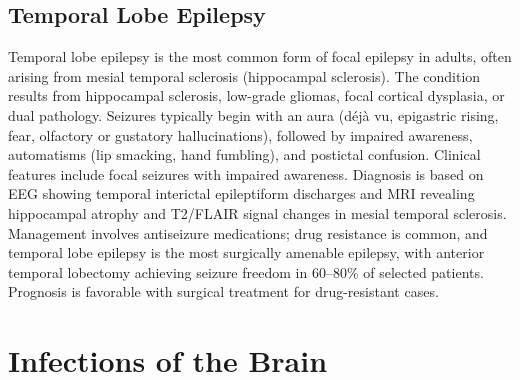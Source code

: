 \subsection{Temporal Lobe Epilepsy}
\label{sec:Temporal Lobe Epilepsy}
Temporal lobe epilepsy is the most common form of focal epilepsy in adults, often arising from mesial temporal sclerosis (hippocampal sclerosis). The condition results from hippocampal sclerosis, low-grade gliomas, focal cortical dysplasia, or dual pathology. Seizures typically begin with an aura (d\'{e}j\`{a} vu, epigastric rising, fear, olfactory or gustatory hallucinations), followed by impaired awareness, automatisms (lip smacking, hand fumbling), and postictal confusion. Clinical features include focal seizures with impaired awareness. Diagnosis is based on EEG showing temporal interictal epileptiform discharges and MRI revealing hippocampal atrophy and T2/FLAIR signal changes in mesial temporal sclerosis. Management involves antiseizure medications; drug resistance is common, and temporal lobe epilepsy is the most surgically amenable epilepsy, with anterior temporal lobectomy achieving seizure freedom in 60--80\% of selected patients. Prognosis is favorable with surgical treatment for drug-resistant cases.

\section{Infections of the Brain}








\label{sec:Infections of the Brain}


